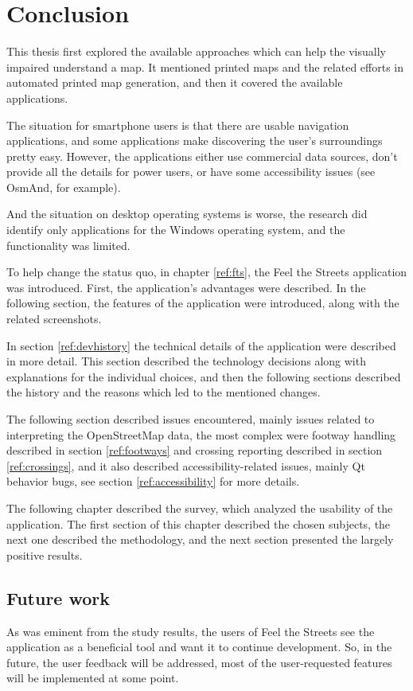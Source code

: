 \documentclass[nolof,digital]{fithesis3}
\begin{document}
\chapter{Conclusion}
This thesis first explored the available approaches which can help the visually impaired understand a map. It mentioned printed maps and the related efforts in automated printed map generation, and then it covered the available applications.

The situation for smartphone users is that there are usable navigation applications, and some applications make discovering the user's surroundings pretty easy. However, the applications either use commercial data sources, don't provide all the details for power users, or have some accessibility issues (see OsmAnd, for example).

And the situation on desktop operating systems is worse, the research did identify only applications for the Windows operating system, and the functionality was limited.

To help change the status quo, in chapter \ref{ref:fts}, the Feel the Streets application was introduced. First, the application's advantages were described. In the following section, the features of the application were introduced, along with the related screenshots.

In section \ref{ref:devhistory} the technical details of the application were described in more detail. This section described the technology decisions along with explanations for the individual choices, and then the following sections described the history and the reasons which led to the mentioned changes.

The following section described issues encountered, mainly issues related to interpreting the OpenStreetMap data, the most complex were footway handling described in section \ref{ref:footways} and crossing reporting described in section \ref{ref:crossings}, and it also described accessibility-related issues, mainly Qt behavior bugs, see section \ref{ref:accessibility} for more details.

The following chapter described the survey, which analyzed the usability of the application. The first section of this chapter described the chosen subjects, the next one described the methodology, and the next section presented the largely positive results.
\section{Future work}
As was eminent from the study results, the users of Feel the Streets see the application as a beneficial tool and want it to continue development. So, in the future, the user feedback will be addressed, most of the user-requested features will be implemented at some point.
\end{document}
